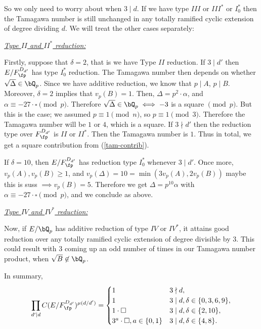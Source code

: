So we only need to worry about when $3 \mid d$. If we have type $III$ or $III^*$ or $I_0^*$ then the Tamagawa number is still unchanged in any totally ramified cyclic extension of degree dividing $d$. We will treat the other cases separately: 

\vspace{1em}

\noindent\underline{\textit{Type $II$ and $II^*$ reduction:}}

Firstly, suppose that $\delta = 2$, that is we have Type $II$ reduction. If $3 \mid d'$ then $E / F_{\fp}^{D_{d'}}$ has type $I_0^*$ reduction. The Tamagawa number then depends on whether $\sqrt{\Delta} \in \bQ_p$. Since we have additive reduction, we know that $p \mid A$, $p \mid B$. Moreover, $\delta = 2$ implies that $v_p(B) = 1$. Then, $\Delta = p^2\cdot \alpha$, and $\alpha \equiv -27\cdot\square \pmod p$. Therefore $\sqrt{\Delta} \in \bQ_p \iff -3$ is a square $\pmod p$. But this is the case; we assumed $p \equiv 1 \pmod n$, so $p \equiv 1 \pmod 3$. Therefore the Tamagawa number will be $1$ or $4$, which is a square.
If $3 \nmid d'$ then the reduction type over $ F_{\fp}^{D_{d'}}$ is $II$ or $II^*$. Then the Tamagawa number is $1$. Thus in total, we get a square contribution from (\ref{tam-contrib}).

If $\delta = 10$, then $E / F_{\fp}^{D_{d'}}$ has reduction type $I_0^*$ whenever $3 \mid d'$. Once more, $v_p(A), v_p(B) \geq 1$, and $v_p(\Delta) = 10 = \min(3 v_p(A), 2 v_p(B))$ {\color{red} maybe this is suss} $\implies v_p(B) = 5$. Therefore we get $\Delta = p^{10} \alpha$ with $\alpha \equiv -27\cdot\square \pmod p$, and we conclude as above.

\vspace{1em}

\noindent\underline{\textit{Type $IV$ and $IV^*$ reduction:}}

Now, if $E /\bQ_p$ has additive reduction of type $IV$ or $IV^*$, it attains good reduction over any totally ramified cyclic extension of degree divisible by $3$. This could result with $3$ coming up an odd number of times in our Tamagawa number product, when $\sqrt{B} \not\in \bQ_p$. 

\vspace{1em}
In summary, 
\begin{equation}
    \prod_{d ' \mid d} C(E / F_{\fp}^{D_{d'}})^{\mu(d / d')}
    = 
    \begin{cases}
        1 & 3 \nmid d, \\
        1 & 3 \mid d, \delta \in \{0, 3, 6, 9\}, \\
        1 \cdot \square & 3 \mid d, \delta \in \{2, 10\}, \\
        3^a \cdot\square, a \in \{0,1\} & 3 \mid d, \delta \in \{4,8\}.
    \end{cases}
\end{equation}

